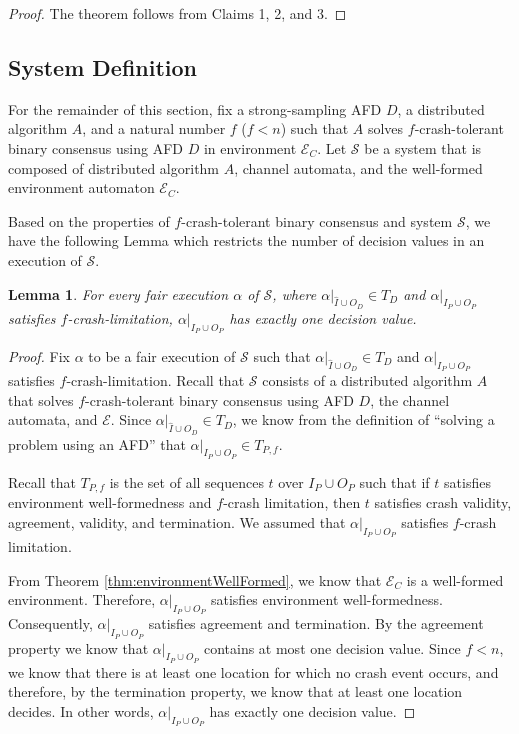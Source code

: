 \documentclass[11pt]{article}
\numberwithin{theorem}{section}
\newtheorem{lemma}[theorem]{Lemma}
\begin{document}
\begin{proof}
 The theorem follows from Claims 1, 2, and 3.
\end{proof}

\subsection{System Definition}
\label{subsec:consensusSystem}

For the remainder of this section, fix a strong-sampling AFD $D$, a distributed algorithm $A$, and a natural number $f$ ($f< n$) such that $A$ solves $f$-crash-tolerant
binary consensus using AFD $D$ in environment $\mathcal{E}_C$.
Let $\mathcal{S}$ be a system that is composed of distributed
algorithm $A$, channel automata, and the well-formed environment
automaton $\mathcal{E}_C$.

Based on the properties of $f$-crash-tolerant binary consensus and
system $\mathcal{S}$, we have the following Lemma which
restricts the number of decision values in an execution of
$\mathcal{S}$.



\begin{lemma}
\label{lem:fairExecExactlyOneDecision}
For every
 fair execution $\alpha$ of $\mathcal{S}$, where
$\alpha|_{\hat{I} \cup O_D} \in T_D$ and $\alpha|_{I_P \cup O_P}$
satisfies $f$-crash-limitation, $\alpha|_{I_P \cup O_P}$ has exactly
one decision value.
\end{lemma}





\begin{proof}
Fix $\alpha$ to be a fair execution of $\mathcal{S}$ such that
$\alpha|_{\hat{I} \cup O_D} \in T_D$ and $\alpha|_{I_P \cup O_P}$
satisfies $f$-crash-limitation. Recall that $\mathcal{S}$ consists of
a distributed algorithm $A$ that solves $f$-crash-tolerant binary
consensus using AFD $D$, the channel automata, and
$\mathcal{E}$. Since $\alpha|_{\hat{I} \cup O_D} \in T_D$, we know
from the definition of ``solving a problem using an AFD'' that
$\alpha|_{I_P \cup O_P} \in T_{P,f}$.


Recall that $T_{P,f}$ is the set of all sequences $t$ over $I_P \cup O_P$
such that if $t$ satisfies environment well-formedness and $f$-crash
limitation, then $t$ satisfies crash validity, agreement, validity,
and termination. We assumed that $\alpha|_{I_P \cup O_P}$ satisfies
$f$-crash limitation.

From Theorem \ref{thm:environmentWellFormed}, we know that
$\mathcal{E}_C$ is a well-formed environment. Therefore, $\alpha|_{I_P
  \cup O_P}$ satisfies environment well-formedness. Consequently,
$\alpha|_{I_P \cup O_P}$ satisfies agreement and termination. By the
agreement property we know that $\alpha|_{I_P \cup O_P}$ contains at
most one decision value. Since $f < n$, we know that there is at least one location for which no crash event occurs, and therefore, by the
termination property, we know that at least one location decides. In
other words,  $\alpha|_{I_P \cup O_P}$ has exactly one decision value.
\end{proof}
\end{document}
